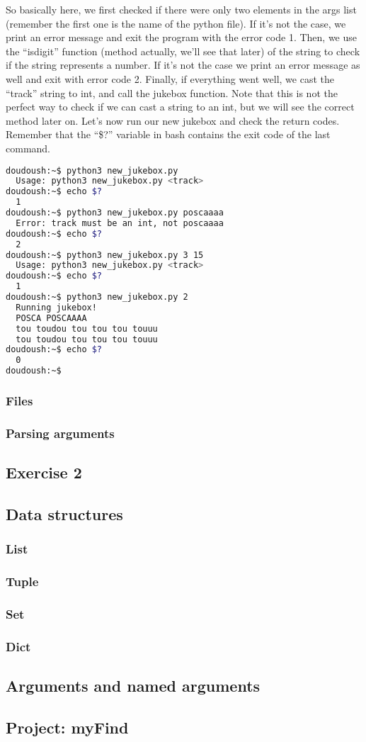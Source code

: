 So basically here, we first checked if there were only two elements in the args
list (remember the first one is the name of the python file). If it's not the case,
we print an error message and exit the program with the error code 1. Then, we use
the ``isdigit'' function (method actually, we'll see that later) of the string
to check if the string represents a number. If it's not the case we print an error
message as well and exit with error code 2. Finally, if everything went well, we
cast the ``track'' string to int, and call the jukebox function. Note that this
is not the perfect way to check if we can cast a string to an int, but we will see
the correct method later on. Let's now run our new jukebox and check the return codes.
Remember that the ``\$?'' variable in bash contains the exit code of the last command.

\begin{lstlisting}[language=bash]
doudoush:~$ python3 new_jukebox.py
  Usage: python3 new_jukebox.py <track>
doudoush:~$ echo $?
  1
doudoush:~$ python3 new_jukebox.py poscaaaa
  Error: track must be an int, not poscaaaa
doudoush:~$ echo $?
  2
doudoush:~$ python3 new_jukebox.py 3 15
  Usage: python3 new_jukebox.py <track>
doudoush:~$ echo $?
  1
doudoush:~$ python3 new_jukebox.py 2
  Running jukebox!
  POSCA POSCAAAA
  tou toudou tou tou tou touuu
  tou toudou tou tou tou touuu
doudoush:~$ echo $?
  0
doudoush:~$
\end{lstlisting}


\subsubsection{Files}
\subsubsection{Parsing arguments}

\subsection{Exercise 2}

\subsection{Data structures}
\subsubsection{List}
\subsubsection{Tuple}
\subsubsection{Set}
\subsubsection{Dict}

\subsection{Arguments and named arguments}

\subsection{Project: myFind}
